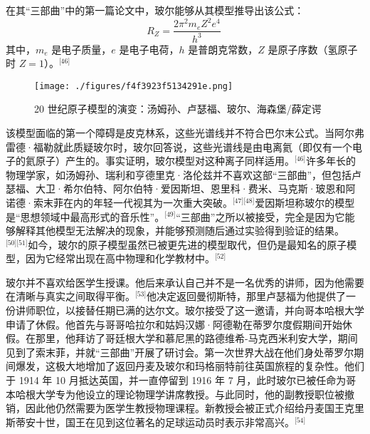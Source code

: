 在其“三部曲”中的第一篇论文中，玻尔能够从其模型推导出该公式：
$$
R_Z = \frac{2 \pi^2 m_e Z^2 e^4}{h^3}~
$$
其中，$m_e$ 是电子质量，$e$ 是电子电荷，$h$ 是普朗克常数，$Z$ 是原子序数（氢原子时 $Z=1$）。\(^\text{[46]}\)
\begin{figure}[ht]
\centering
\texttt{[image: ./figures/f4f3923f5134291e.png]}
\caption{20 世纪原子模型的演变：汤姆孙、卢瑟福、玻尔、海森堡/薛定谔} \label{fig_NRSbr_5}
\end{figure}
该模型面临的第一个障碍是皮克林系，这些光谱线并不符合巴尔末公式。当阿尔弗雷德·福勒就此质疑玻尔时，玻尔回答说，这些光谱线是由电离氦（即仅有一个电子的氦原子）产生的。事实证明，玻尔模型对这种离子同样适用。\(^\text{[46]}\)许多年长的物理学家，如汤姆孙、瑞利和亨德里克·洛伦兹并不喜欢这部“三部曲”，但包括卢瑟福、大卫·希尔伯特、阿尔伯特·爱因斯坦、恩里科·费米、马克斯·玻恩和阿诺德·索末菲在内的年轻一代视其为一次重大突破。\(^\text{[47][48]}\)爱因斯坦称玻尔的模型是“思想领域中最高形式的音乐性”。\(^\text{[49]}\)“三部曲”之所以被接受，完全是因为它能够解释其他模型无法解决的现象，并能够预测随后通过实验得到验证的结果。\(^\text{[50][51]}\)如今，玻尔的原子模型虽然已被更先进的模型取代，但仍是最知名的原子模型，因为它经常出现在高中物理和化学教材中。\(^\text{[52]}\)

玻尔并不喜欢给医学生授课。他后来承认自己并不是一名优秀的讲师，因为他需要在清晰与真实之间取得平衡。\(^\text{[53]}\)他决定返回曼彻斯特，那里卢瑟福为他提供了一份讲师职位，以接替任期已满的达尔文。玻尔接受了这一邀请，并向哥本哈根大学申请了休假。他首先与哥哥哈拉尔和姑妈汉娜·阿德勒在蒂罗尔度假期间开始休假。在那里，他拜访了哥廷根大学和慕尼黑的路德维希-马克西米利安大学，期间见到了索末菲，并就“三部曲”开展了研讨会。第一次世界大战在他们身处蒂罗尔期间爆发，这极大地增加了返回丹麦及玻尔和玛格丽特前往英国旅程的复杂性。他们于 1914 年 10 月抵达英国，并一直停留到 1916 年 7 月，此时玻尔已被任命为哥本哈根大学专为他设立的理论物理学讲席教授。与此同时，他的副教授职位被撤销，因此他仍然需要为医学生教授物理课程。新教授会被正式介绍给丹麦国王克里斯蒂安十世，国王在见到这位著名的足球运动员时表示非常高兴。\(^\text{[54]}\)
